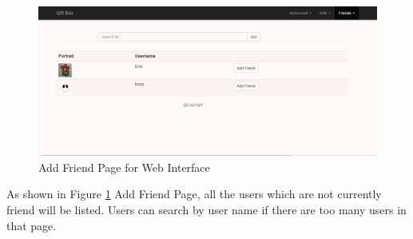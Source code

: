 \begin{figure}[htb]
\centering
\includegraphics[width=.9\textwidth]{section03/assets/AddFriends.png}
\caption[Add Friend Page for Web Interface]{\label{AddFriends}Add Friend Page for Web Interface}
\end{figure}
\par As shown in Figure \ref{AddFriends} Add Friend Page, all the users which are not currently friend will be listed. Users can search by user name if there are too many users in that page.
